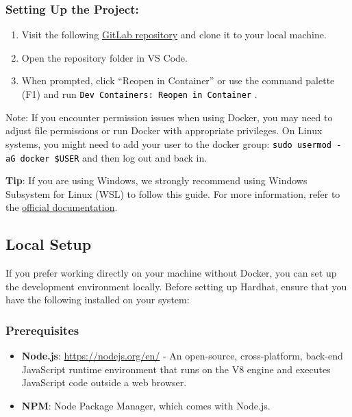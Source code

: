 \documentclass[12pt]{article}
\newcommand{\codegrey}[1]{%
  \texttt{\colorbox{black!4}{\textcolor{black}{#1}}}%
}
\begin{document}
\subsubsection*{Setting Up the Project:}

\begin{enumerate}
    \item Visit the following
          \href{https://gitlab.fel.cvut.cz/radovluk/smart-contracts-exercises/-/tree/main/01-Hello-Blockchain-World/task/task-code}{GitLab
              repository} and clone it to your local machine.
    \item Open the repository folder in VS Code.
    \item When prompted, click ``Reopen in Container'' or use the command palette (F1)
          and run \codegrey{Dev Containers: Reopen in Container}.
\end{enumerate}

\noindent
Note: If you encounter permission issues when using Docker, you may need to adjust file permissions or run Docker with appropriate privileges. On Linux systems, you might need to add your user to the docker group: \codegrey{sudo usermod -aG docker \$USER} and then log out and back in.

\medskip
\noindent
\textbf{Tip}: If you are using Windows, we strongly recommend using Windows Subsystem for Linux (WSL) to follow this guide. For more information, refer to the \href{https://learn.microsoft.com/en-us/windows/wsl/about}{official documentation}.

\subsection{Local Setup}

If you prefer working directly on your machine without Docker, you can set up
the development environment locally. Before setting up Hardhat, ensure that you
have the following installed on your system:

\subsubsection*{Prerequisites}
\begin{itemize}
    \item \textbf{Node.js}: \url{https://nodejs.org/en/} - An open-source, cross-platform, back-end JavaScript runtime environment that runs on the V8 engine and executes JavaScript code outside a web browser.
    \item \textbf{NPM}: Node Package Manager, which comes with Node.js.
\end{itemize}
\end{document}
